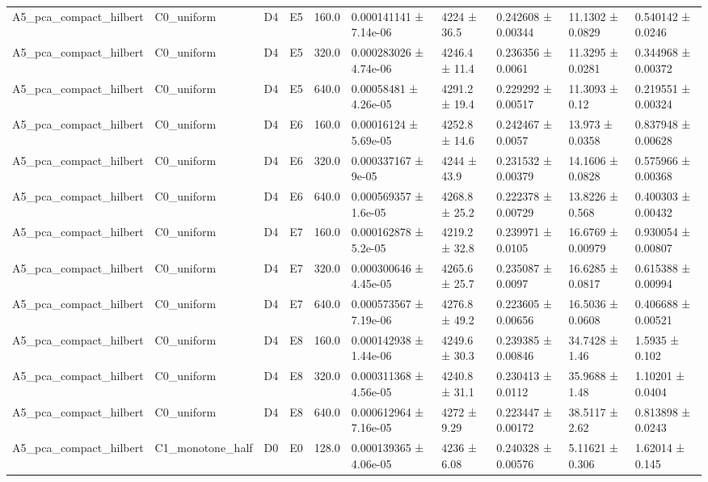 \begin{table}
\begin{tabular}{llllllllll}
A5\_pca\_compact\_hilbert & C0\_uniform & D4 & E5 & 160.0 & 0.000141141 ± 7.14e-06 & 4224 ± 36.5 & 0.242608 ± 0.00344 & 11.1302 ± 0.0829 & 0.540142 ± 0.0246 \\
A5\_pca\_compact\_hilbert & C0\_uniform & D4 & E5 & 320.0 & 0.000283026 ± 4.74e-06 & 4246.4 ± 11.4 & 0.236356 ± 0.0061 & 11.3295 ± 0.0281 & 0.344968 ± 0.00372 \\
A5\_pca\_compact\_hilbert & C0\_uniform & D4 & E5 & 640.0 & 0.00058481 ± 4.26e-05 & 4291.2 ± 19.4 & 0.229292 ± 0.00517 & 11.3093 ± 0.12 & 0.219551 ± 0.00324 \\
A5\_pca\_compact\_hilbert & C0\_uniform & D4 & E6 & 160.0 & 0.00016124 ± 5.69e-05 & 4252.8 ± 14.6 & 0.242467 ± 0.0057 & 13.973 ± 0.0358 & 0.837948 ± 0.00628 \\
A5\_pca\_compact\_hilbert & C0\_uniform & D4 & E6 & 320.0 & 0.000337167 ± 9e-05 & 4244 ± 43.9 & 0.231532 ± 0.00379 & 14.1606 ± 0.0828 & 0.575966 ± 0.00368 \\
A5\_pca\_compact\_hilbert & C0\_uniform & D4 & E6 & 640.0 & 0.000569357 ± 1.6e-05 & 4268.8 ± 25.2 & 0.222378 ± 0.00729 & 13.8226 ± 0.568 & 0.400303 ± 0.00432 \\
A5\_pca\_compact\_hilbert & C0\_uniform & D4 & E7 & 160.0 & 0.000162878 ± 5.2e-05 & 4219.2 ± 32.8 & 0.239971 ± 0.0105 & 16.6769 ± 0.00979 & 0.930054 ± 0.00807 \\
A5\_pca\_compact\_hilbert & C0\_uniform & D4 & E7 & 320.0 & 0.000300646 ± 4.45e-05 & 4265.6 ± 25.7 & 0.235087 ± 0.0097 & 16.6285 ± 0.0817 & 0.615388 ± 0.00994 \\
A5\_pca\_compact\_hilbert & C0\_uniform & D4 & E7 & 640.0 & 0.000573567 ± 7.19e-06 & 4276.8 ± 49.2 & 0.223605 ± 0.00656 & 16.5036 ± 0.0608 & 0.406688 ± 0.00521 \\
A5\_pca\_compact\_hilbert & C0\_uniform & D4 & E8 & 160.0 & 0.000142938 ± 1.44e-06 & 4249.6 ± 30.3 & 0.239385 ± 0.00846 & 34.7428 ± 1.46 & 1.5935 ± 0.102 \\
A5\_pca\_compact\_hilbert & C0\_uniform & D4 & E8 & 320.0 & 0.000311368 ± 4.56e-05 & 4240.8 ± 31.1 & 0.230413 ± 0.0112 & 35.9688 ± 1.48 & 1.10201 ± 0.0404 \\
A5\_pca\_compact\_hilbert & C0\_uniform & D4 & E8 & 640.0 & 0.000612964 ± 7.16e-05 & 4272 ± 9.29 & 0.223447 ± 0.00172 & 38.5117 ± 2.62 & 0.813898 ± 0.0243 \\
A5\_pca\_compact\_hilbert & C1\_monotone\_half & D0 & E0 & 128.0 & 0.000139365 ± 4.06e-05 & 4236 ± 6.08 & 0.240328 ± 0.00576 & 5.11621 ± 0.306 & 1.62014 ± 0.145 \\

\end{tabular}
\end{table}
